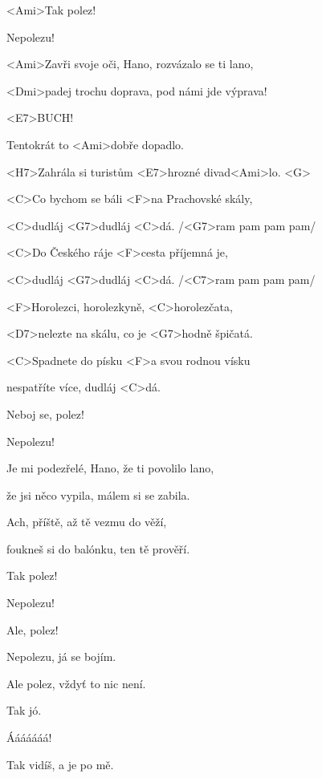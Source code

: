 

<Ami>Tak polez!

Nepolezu!

\zs
<Ami>Zavři svoje oči, Hano, rozvázalo se ti lano,

<Dmi>padej trochu doprava, pod námi jde výprava!

<E7>BUCH!

Tentokrát to <Ami>dobře dopadlo.

<H7>Zahrála si turistům <E7>hrozné divad<Ami>lo. <G> \ks

\zr
<C>Co bychom se báli <F>na Prachovské skály,

<C>dudláj <G7>dudláj <C>dá. /<G7>ram pam pam pam/

<C>Do Českého ráje <F>cesta příjemná je,

<C>dudláj <G7>dudláj <C>dá. /<C7>ram pam pam pam/

<F>Horolezci, horolezkyně, <C>horolezčata,

<D7>nelezte na skálu, co je <G7>hodně špičatá.

<C>Spadnete do písku <F>a svou rodnou vísku

nespatříte více, dudláj <C>dá.
\kr

Neboj se, polez!

Nepolezu!

\zs
Je mi podezřelé, Hano, že ti povolilo lano,

že jsi něco vypila, málem si se zabila.

Ach, příště, až tě vezmu do věží,

foukneš si do balónku, ten tě prověří.
\ks

\zr	\kr

Tak polez!

Nepolezu!

Ale, polez!

Nepolezu, já se bojím.

Ale polez, vždyť to nic není.

Tak jó.

Ááááááá!

Tak vidíš, a je po mě.

\kp
